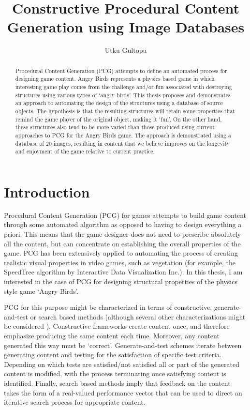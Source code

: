 \documentclass{dalthesis}
\begin{document}
\title{Constructive Procedural Content Generation using Image Databases}
\author{Utku Gultopu}
\mcs
{}

\nolistoftables

\frontmatter

\begin{abstract}
Procedural Content Generation (PCG) attempts to define an automated process for designing game content. Angry Birds represents a physics based game in which interesting game play comes from the challenge and/or fun associated with destroying structures using various types of `angry birds'. This thesis proposes and demonstrates an approach to automating the design of the structures using a database of source objects. The hypothesis is that the resulting structures will retain some properties that remind the game player of the original object, making it `fun'. On the other hand, these structures also tend to be more varied than those produced using current approaches to PCG for the Angry Birds game. The approach is demonstrated using a database of 20 images, resulting in content that we believe improves on the longevity and enjoyment of the game relative to current practice.
\end{abstract}

\mainmatter

\chapter{Introduction}
Procedural Content Generation (PCG) for games attempts to build game content through some automated algorithm as opposed to having to design everything a priori. This means that the game designer does not need to prescribe absolutely all the content, but can concentrate on establishing the overall properties of the game. PCG has been extensively applied to automating the process of creating realistic visual properties in video games, such as vegetation (for example, the SpeedTree algorithm by Interactive Data Visualization Inc.). In this thesis, I am interested in the case of PCG for designing structural properties of the physics style game `Angry Birds'.

PCG for this purpose might be characterized in terms of constructive, generate-and-test or search based methods (although several other characterizations might be considered \cite{togelius11}). Constructive frameworks create content once, and therefore emphasize producing the same content each time. Moreover, any content generated this way must be `correct'. Generate-and-test schemes iterate between generating content and testing for the satisfaction of specific test criteria. Depending on which tests are satisfied/not satisfied all or part of the generated content is modified, with the process terminating once satisfying content is identified. Finally, search based methods imply that feedback on the content takes the form of a real-valued performance vector that can be used to direct an iterative search process for appropriate content.
\end{document}
